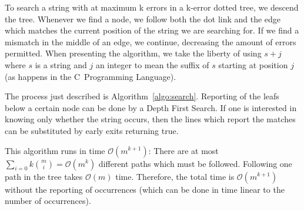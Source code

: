 To search a string with at maximum k errors in a k-error dotted tree, we descend the tree. Whenever we find a node, we follow both the dot link and the edge which matches the current position of the string we are searching for. If we find a mismatch in the middle of an edge, we continue, decreasing the amount of errors permitted. When presenting the algorithm, we take the liberty of using $s+j$ where $s$ is a string and $j$ an integer to mean the suffix of $s$ starting at position $j$ (as happens in the C~Programming Language).



The process just described is Algorithm~\ref{algo:search}. Reporting of the leafs below a certain node can be done by a Depth First Search. If one is interested in knowing only whether the string occurs, then the lines which report the matches can be substituted by early exits returning true.

This algorithm runs in time $\mathcal{O}(m^{k+1})$: There are at most $\sum_{i=0}{k}{m \choose i}=\mathcal{O}(m^k)$ different paths which must be followed. Following one path in the tree takes $\mathcal{O}(m)$ time. Therefore, the total time is $\mathcal{O}(m^{k+1})$ without the reporting of occurrences (which can be done in time linear to the number of occurrences).
